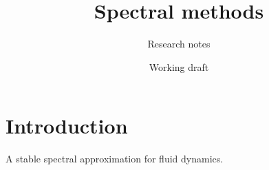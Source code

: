 \documentclass[11pt]{article}
\title{Spectral methods}
\author{Research notes}
\date{Working draft}
\begin{document}
\maketitle
\section{Introduction}
A stable spectral approximation for fluid dynamics.
\end{document}
